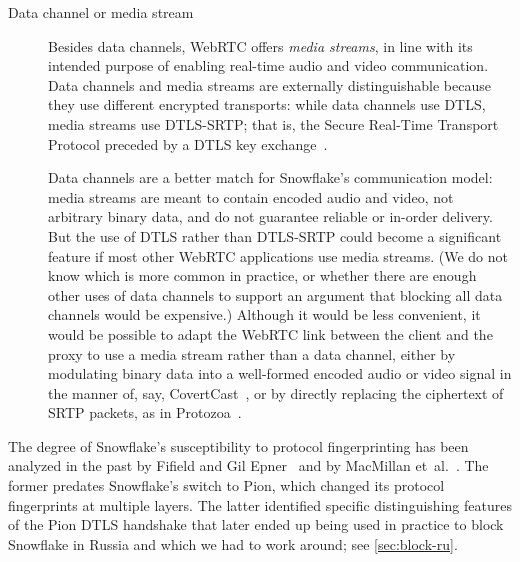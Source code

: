 \documentclass[letterpaper,twocolumn]{article}
\newcommand{\firstterm}[1]{\textit{#1}}
\begin{document}
\begin{description}
\item[Data channel or media stream]
Besides data channels, WebRTC offers \firstterm{media streams},
in line with its intended purpose of enabling real-time
audio and video communication.
Data channels and media streams are externally distinguishable
because they use different encrypted transports:
while data channels use DTLS,
media streams use DTLS-SRTP;
that is, the Secure Real-Time Transport Protocol
preceded by a DTLS key exchange~\cite[\S 4.3]{rfc8827}.

Data channels are a better match for Snowflake's communication model:
media streams are meant to contain encoded audio and video,
not arbitrary binary data,
and do not guarantee reliable or in-order delivery.
But the use of DTLS rather than DTLS-SRTP could become
a significant feature if most other WebRTC applications use media streams.
(We do not know which is more common in practice,
or whether there are enough other uses of data channels
to support an argument that blocking all data channels would be expensive.)
Although it would be less convenient,
it would be possible to adapt the WebRTC link between
the client and the proxy
to use a media stream rather than a data channel,
either by modulating binary data into a well-formed encoded
audio or video signal in the manner of, say,
CovertCast~\cite[\S 4.3]{McPherson2016a},
or by directly replacing the ciphertext of SRTP packets,
as in Protozoa~\cite[\S 4.4]{Barradas2020a}.

\end{description}

The degree of Snowflake's susceptibility to protocol fingerprinting
has been analyzed in the past by
Fifield and Gil Epner~\cite{arxiv.1605.08805} and by
MacMillan et~al.~\cite{arxiv.2008.03254}.
The former predates Snowflake's switch to Pion,
which changed its protocol fingerprints at multiple layers.
The latter identified specific distinguishing features
of the Pion DTLS handshake
that later ended up being used in practice
to block Snowflake in Russia
and which we had to work around;
see \autoref{sec:block-ru}.
\end{document}
